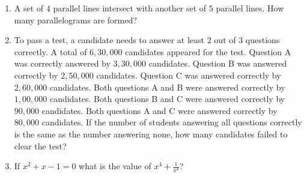 \documentclass[journal]{IEEEtran}
\begin{document}
\begin{enumerate}
    \item A set of $4$ parallel lines intersect with another set of $5$ parallel lines. How many parallelograms are formed?
    
    \hfill{}
    \begin{enumerate}
    \end{enumerate}
    
    \item To pass a test, a candidate needs to answer at least $2$ out of $3$ questions correctly. A total of $6,30,000$ candidates appeared for the test. Question A was correctly answered by $3,30,000$ candidates. Question B was answered correctly by $2,50,000$ candidates. Question C was answered correctly by $2,60,000$ candidates. Both questions A and B were answered correctly by $1,00,000$ candidates. Both questions B and C were answered correctly by $90,000$ candidates. Both questions A and C were answered correctly by $80,000$ candidates. If the number of students answering all questions correctly is the same as the number answering none, how many candidates failed to clear the test?
    
    \hfill{}
    \begin{enumerate}
    \end{enumerate}

    \item If $x^{2}+x-1=0$ what is the value of $x^{4}+\frac{1}{x^{4}}$?
    
    \hfill{}
    \begin{enumerate}
    \end{enumerate}
    

\end{enumerate}
\end{document}
